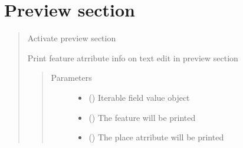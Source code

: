 \documentclass[letterpaper,10pt,english]{sphinxmanual}
\begin{document}
\section{Preview section}
\label{\detokenize{dialog_interaction:preview-section}}\begin{quote}

\begin{fulllineitems}
\label{\detokenize{dialog_interaction:resultPreview}}
Activate preview section

\end{fulllineitems}


\begin{fulllineitems}
\label{\detokenize{dialog_interaction:attrPrinter}}
Print feature atrribute info on text edit in preview section
\begin{quote}\begin{description}
\item[{Parameters}] \leavevmode\begin{itemize}
\item {} 
 () \textendash{} Iterable field value object

\item {} 
 () \textendash{} The feature will be printed

\item {} 
 () \textendash{} The place atrribute will be printed

\end{itemize}

\end{description}\end{quote}

\end{fulllineitems}


\end{quote}
\end{document}
